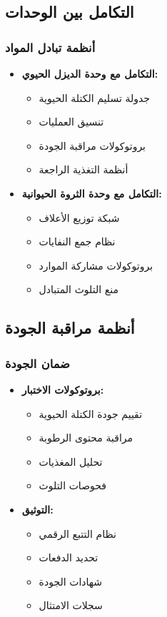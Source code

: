 \subsection{التكامل بين الوحدات}

\subsubsection{أنظمة تبادل المواد}
\begin{itemize}
    \item \textbf{التكامل مع وحدة الديزل الحيوي:}
    \begin{itemize}
        \item جدولة تسليم الكتلة الحيوية
        \item تنسيق العمليات
        \item بروتوكولات مراقبة الجودة
        \item أنظمة التغذية الراجعة
    \end{itemize}
    
    \item \textbf{التكامل مع وحدة الثروة الحيوانية:}
    \begin{itemize}
        \item شبكة توزيع الأعلاف
        \item نظام جمع النفايات
        \item بروتوكولات مشاركة الموارد
        \item منع التلوث المتبادل
    \end{itemize}
\end{itemize}

\subsection{أنظمة مراقبة الجودة}

\subsubsection{ضمان الجودة}
\begin{itemize}
    \item \textbf{بروتوكولات الاختبار:}
    \begin{itemize}
        \item تقييم جودة الكتلة الحيوية
        \item مراقبة محتوى الرطوبة
        \item تحليل المغذيات
        \item فحوصات التلوث
    \end{itemize}
    
    \item \textbf{التوثيق:}
    \begin{itemize}
        \item نظام التتبع الرقمي
        \item تحديد الدفعات
        \item شهادات الجودة
        \item سجلات الامتثال
    \end{itemize}
\end{itemize}

